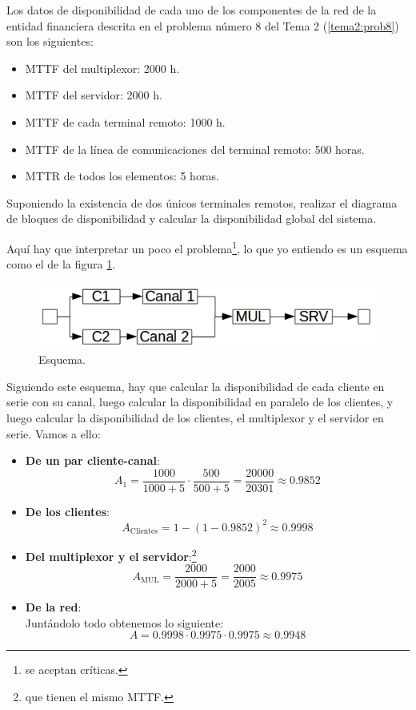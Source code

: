 \begin{problem}[4]
Los datos de disponibilidad de cada uno de los componentes de la red de la entidad financiera descrita en el problema número 8 del Tema 2 (\ref{tema2:prob8}) son los siguientes:
\begin{itemize}
	\item MTTF del multiplexor: 2000 h.
	\item MTTF del servidor: 2000 h.
	\item MTTF de cada terminal remoto: 1000 h.
	\item MTTF de la línea de comunicaciones del terminal remoto: 500 horas.
	\item MTTR de todos los elementos: 5 horas.
\end{itemize}

Suponiendo la existencia de dos únicos terminales remotos, realizar el diagrama de bloques de disponibilidad y calcular la disponibilidad global del sistema.

\solution

Aquí hay que interpretar un poco el problema\footnote{se aceptan críticas.}, lo que yo entiendo es un esquema como el de la figura \ref{tema3:prob4:esquema}.
\begin{figure}[hbtp]
	\centering
	\includegraphics[keepaspectratio=true,width=0.8\linewidth]{img/tema3_ej4.png}
	\caption{Esquema.}
	\label{tema3:prob4:esquema}
\end{figure}

Siguiendo este esquema, hay que calcular la disponibilidad de cada cliente en serie con su canal, luego calcular la disponibilidad en paralelo de los clientes, y luego calcular la disponibilidad de los clientes, el multiplexor y el servidor en serie. Vamos a ello:
\begin{itemize}
\item \textbf{De un par cliente-canal}:
\[ A_1 = \frac{1000}{1000+5} \cdot \frac{500}{500+5} = \frac{20000}{20301} \approx 0.9852 \]
\item \textbf{De los clientes}:
\[ A_{\text{Clientes}} = 1 - (1 - 0.9852)^2 \approx 0.9998 \]
\item \textbf{Del multiplexor y el servidor}:\footnote{que tienen el mismo MTTF.}
\[ A_{\text{MUL}} = \frac{2000}{2000+5} = \frac{2000}{2005} \approx 0.9975 \]
\item \textbf{De la red}:\\
Juntándolo todo obtenemos lo siguiente:
\[ A = 0.9998 \cdot 0.9975 \cdot 0.9975 \approx 0.9948 \]
\end{itemize}

\end{problem}

